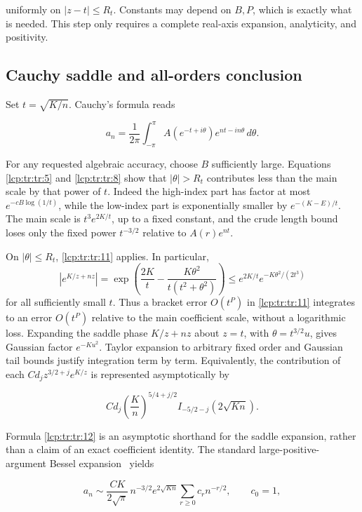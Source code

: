 \documentclass[11pt]{article}
\numberwithin{equation}{section}
\theoremstyle{definition}\newtheorem{definition}[theorem]{Definition}
\theoremstyle{remark}\newtheorem{remark}[theorem]{Remark}
\begin{document}
uniformly on \(|z-t|\le R_t\). Constants may depend on \(B,P\), which is
exactly what is needed. This step only requires a complete real-axis
expansion, analyticity, and positivity.

\subsection{Cauchy saddle and all-orders
conclusion}\label{lcp:tr:cauchy-saddle-and-all-orders-conclusion}

Set \(t=\sqrt{K/n}\). Cauchy's formula reads

\[
a_n=\frac1{2\pi}\int_{-\pi}^{\pi}A(e^{-t+i\theta})e^{nt-in\theta}\,d\theta.
\]

For any requested algebraic accuracy, choose \(B\) sufficiently large.
Equations \eqref{lcp:tr:tr:5} and \eqref{lcp:tr:tr:8} show that \(|\theta|>R_t\)
contributes less than the main scale by that power of \(t\). Indeed the
high-index part has factor at most \(e^{-cB\log(1/t)}\), while the
low-index part is exponentially smaller by \(e^{-(K-E)/t}\). The main
scale is \(t^3e^{2K/t}\), up to a fixed constant, and the crude length
bound loses only the fixed power \(t^{-3/2}\) relative to
\(A(r)e^{nt}\).

On \(|\theta|\le R_t\), \eqref{lcp:tr:tr:11} applies. In particular, \[
|e^{K/z+nz}|=\exp\left(\frac{2K}{t}-\frac{K\theta^2}{t(t^2+\theta^2)}\right)
\le e^{2K/t}e^{-K\theta^2/(2t^3)}
\] for all sufficiently small \(t\). Thus a bracket error \(O(t^P)\) in
\eqref{lcp:tr:tr:11} integrates to an error \(O(t^P)\) relative to the main
coefficient scale, without a logarithmic loss. Expanding the saddle
phase \(K/z+nz\) about \(z=t\), with \(\theta=t^{3/2}u\), gives Gaussian
factor \(e^{-Ku^2}\). Taylor expansion to arbitrary fixed order and
Gaussian tail bounds justify integration term by term. Equivalently, the
contribution of each \(C d_j z^{3/2+j}e^{K/z}\) is represented
asymptotically by

\begin{equation}\label{lcp:tr:tr:12}
C d_j\left(\frac Kn\right)^{5/4+j/2}I_{-5/2-j}(2\sqrt{Kn}).
\end{equation}

Formula \eqref{lcp:tr:tr:12} is an asymptotic shorthand for the saddle
expansion, rather than a claim of an exact coefficient identity. The
standard large-positive-argument Bessel expansion~\cite{lcp-tr-dlmf} yields

\begin{equation}\label{lcp:tr:tr:13}
a_n\sim\frac{CK}{2\sqrt\pi}\,n^{-3/2}e^{2\sqrt{Kn}}
\sum_{r\ge0}c_rn^{-r/2},\qquad c_0=1,
\end{equation}
\end{document}
